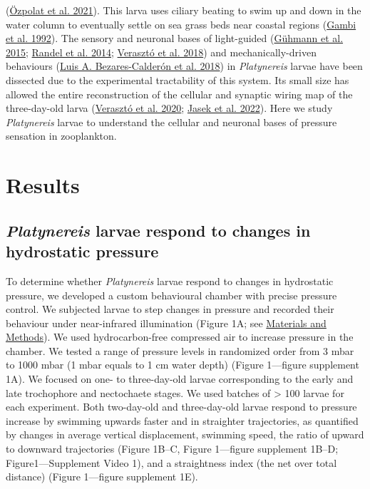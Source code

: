\documentclass[
]{article}
\begin{document}
(\protect\hyperlink{ref-uxf6zpolat2021}{Özpolat et al. 2021}). This
larva uses ciliary beating to swim up and down in the water column to
eventually settle on sea grass beds near coastal regions
(\protect\hyperlink{ref-gambi1992}{Gambi et al. 1992}). The sensory and
neuronal bases of light-guided
(\protect\hyperlink{ref-ghmann_2015}{Gühmann et al. 2015};
\protect\hyperlink{ref-randel2014}{Randel et al. 2014};
\protect\hyperlink{ref-veraszto2018}{Verasztó et al. 2018}) and
mechanically-driven behaviours
(\protect\hyperlink{ref-bezares-calderon2018}{Luis A. Bezares-Calderón
et al. 2018}) in \emph{Platynereis} larvae have been dissected due to
the experimental tractability of this system. Its small size has allowed
the entire reconstruction of the cellular and synaptic wiring map of the
three-day-old larva (\protect\hyperlink{ref-veraszto2020}{Verasztó et
al. 2020}; \protect\hyperlink{ref-jasek2022}{Jasek et al. 2022}). Here
we study \emph{Platynereis} larvae to understand the cellular and
neuronal bases of pressure sensation in zooplankton.

\hypertarget{results}{%
\section{Results}\label{results}}

\hypertarget{platynereis-larvae-respond-to-changes-in-hydrostatic-pressure}{%
\subsection{\texorpdfstring{\emph{Platynereis} larvae respond to changes
in hydrostatic
pressure}{Platynereis larvae respond to changes in hydrostatic pressure}}\label{platynereis-larvae-respond-to-changes-in-hydrostatic-pressure}}

To determine whether \emph{Platynereis} larvae respond to changes in
hydrostatic pressure, we developed a custom behavioural chamber with
precise pressure control. We subjected larvae to step changes in
pressure and recorded their behaviour under near-infrared illumination
(Figure 1A; see \protect\hyperlink{materials-and-methods}{Materials and
Methods}). We used hydrocarbon-free compressed air to increase pressure
in the chamber. We tested a range of pressure levels in randomized order
from 3 mbar to 1000 mbar (1 mbar equals to 1 cm water depth) (Figure
1---figure supplement 1A). We focused on one- to three-day-old larvae
corresponding to the early and late trochophore and nectochaete stages.
We used batches of \textgreater{} 100 larvae for each experiment. Both
two-day-old and three-day-old larvae respond to pressure increase by
swimming upwards faster and in straighter trajectories, as quantified by
changes in average vertical displacement, swimming speed, the ratio of
upward to downward trajectories (Figure 1B--C, Figure 1---figure
supplement 1B--D; Figure1---Supplement Video 1), and a straightness
index (the net over total distance) (Figure 1---figure supplement 1E).
\end{document}
